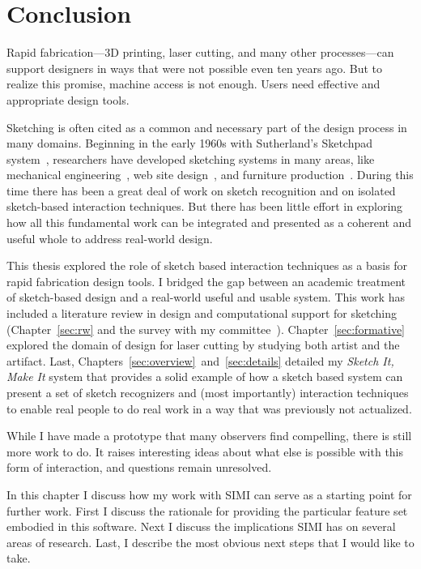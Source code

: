 \chapter{Conclusion}

Rapid fabrication---3D printing, laser cutting, and many other
processes---can support designers in ways that were not possible even
ten years ago. But to realize this promise, machine access is not
enough. Users need effective and appropriate design tools.

Sketching is often cited as a common and necessary part of the design
process in many domains. Beginning in the early 1960s with
Sutherland's Sketchpad system~\cite{sutherland-sketchpad}, researchers
have developed sketching systems in many areas, like mechanical
engineering~\cite{lipson-correlation}, web site
design~\cite{lin-denim}, and furniture
production~\cite{oh-fab,saul-sketch-chair}. During this time there has
been a great deal of work on sketch recognition and on isolated
sketch-based interaction techniques. But there has been little effort
in exploring how all this fundamental work can be integrated and
presented as a coherent and useful whole to address real-world design.

This thesis explored the role of sketch based interaction techniques
as a basis for rapid fabrication design tools. I bridged the gap
between an academic treatment of sketch-based design and a real-world
useful and usable system. This work has included a literature review
in design and computational support for sketching
(Chapter~\ref{sec:rw} and the survey with my
committee~\cite{johnson-sketch-review}). Chapter~\ref{sec:formative}
explored the domain of design for laser cutting by studying both
artist and the artifact. Last,
Chapters~\ref{sec:overview}~and~\ref{sec:details} detailed my
\textit{Sketch It, Make It} system that provides a solid example of
how a sketch based system can present a set of sketch recognizers and
(most importantly) interaction techniques to enable real people to do
real work in a way that was previously not actualized.

While I have made a prototype that many observers find compelling,
there is still more work to do. It raises interesting ideas about what
else is possible with this form of interaction, and questions remain
unresolved.

In this chapter I discuss how my work with SIMI can serve as a
starting point for further work. First I discuss the rationale for
providing the particular feature set embodied in this software. Next I
discuss the implications SIMI has on several areas of research. Last,
I describe the most obvious next steps that I would like to take.

